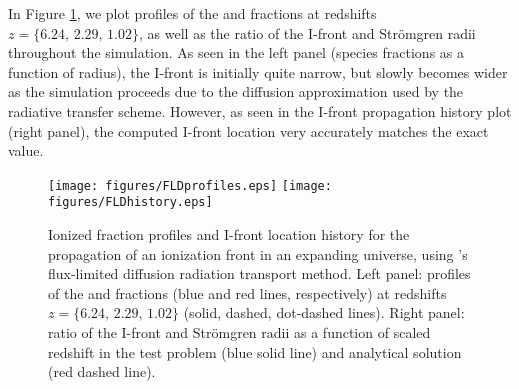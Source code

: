 In Figure \ref{fig.fld}, we plot profiles of the  and
 fractions at redshifts $z=\{6.24,\, 2.29,\, 1.02\}$, as
well as the ratio of the I-front and Str{\" o}mgren radii throughout
the simulation.  As seen in the left panel (species fractions as a
function of radius), the I-front is initially quite narrow, but slowly
becomes wider as the simulation proceeds due to the diffusion
approximation used by the radiative transfer scheme.  However, as seen
in the I-front propagation history plot (right panel), the computed
I-front location very accurately matches the exact value.

\begin{figure}
\begin{center}
\texttt{[image: figures/FLDprofiles.eps]}
\texttt{[image: figures/FLDhistory.eps]}
\caption{Ionized fraction profiles and I-front location history for
the propagation of an ionization front in an expanding universe, using
\enzo's flux-limited diffusion radiation transport method.  Left
panel: profiles of the  and  fractions (blue and
red lines, respectively) at redshifts $z=\{6.24,\, 2.29,\, 1.02\}$
(solid, dashed, dot-dashed lines).  Right panel: ratio of the I-front
and Str{\" o}mgren radii as a function of scaled redshift in the test
problem (blue solid line) and analytical solution (red dashed line).}
\label{fig.fld}
\end{center}
\end{figure}
